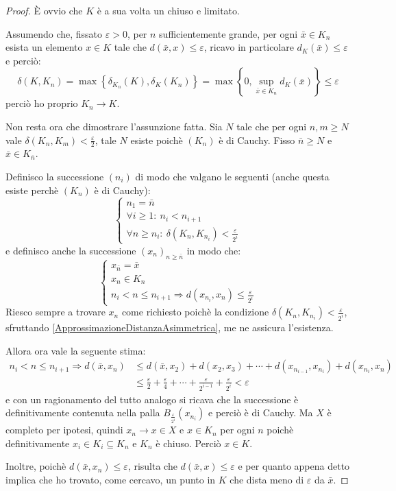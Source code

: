 \begin{proof}
	È ovvio che $K$ è a sua volta un chiuso e limitato.
	
	Assumendo che, fissato $\varepsilon>0$, per $n$ sufficientemente grande, per ogni $\bar{x}\in K_n$ esista un elemento $x\in K$ tale che $d(\bar{x},x)\le \varepsilon$, ricavo in particolare $d_K(\bar{x})\le \varepsilon$ e perciò: 
	\begin{equation*}
		\delta(K,K_n)=\max\left\{\delta_{K_n}(K),\delta_K(K_n)\right\}=\max\left\{0,{}\sup_{\bar{x}\in K_n} d_K(\bar x)\right\}\le \varepsilon
	\end{equation*}
	perciò ho proprio $K_n\to K$.
	
	Non resta ora che dimostrare l'assunzione fatta. Sia $N$ tale che per ogni $n,m\ge N$ vale $\delta(K_n,K_m) < \frac{\varepsilon}2$, tale $N$ esiste poichè $(K_n)$ è di Cauchy. Fisso $\bar{n}\ge N$ e $\bar x\in K_{\bar n}$.
	
	Definisco la successione $(n_i)$ di modo che valgano le seguenti (anche questa esiste perchè $(K_n)$ è di Cauchy):
	\begin{equation*}
	\begin{cases}
		n_1=\bar n\\
		\forall i\ge 1:\ n_i<n_{i+1} \\
		\forall n\ge n_i:\ \delta(K_n,K_{n_i}) < \frac{\varepsilon}{2^i}
	\end{cases}\end{equation*}
	e definisco anche la successione $(x_n)_{n\ge \bar n}$ in modo che:
	\begin{equation*}\begin{cases}
		x_{\bar n}=\bar x\\
		x_n\in K_n\\
		n_i<n\le n_{i+1}\Longrightarrow d(x_{n_i},x_n)\le \frac{\varepsilon}{2^i}
	\end{cases}\end{equation*}
	Riesco sempre a trovare $x_n$ come richiesto poichè la condizione $\delta(K_n,K_{n_i}) < \frac{\varepsilon}{2^i}$, sfruttando \cref{ApprossimazioneDistanzaAsimmetrica}, me ne assicura l'esistenza.
	
	Allora ora vale la seguente stima:
	\begin{align*}
		n_i<n\le n_{i+1}\Longrightarrow d(\bar x, x_n)&\le d(\bar x, x_2)+d(x_2,x_3)+\cdots+d(x_{n_{i-1}},x_{n_i})+
		d(x_{n_i},x_n)\\
		&\le\frac{\varepsilon}2+\frac{\varepsilon}4+\cdots+\frac{\varepsilon}{2^{i-1}}
		+\frac{\varepsilon}{2^i}<\varepsilon
	\end{align*}
	e con un ragionamento del tutto analogo si ricava che la successione è definitivamente contenuta nella palla $B_{\frac{\varepsilon}{2^i}}(x_{n_i})$ e perciò è di Cauchy. 
	Ma $X$ è completo per ipotesi, quindi $x_n\to x\in X$ e $x\in K_n$ per ogni $n$ poichè definitivamente $x_i\in K_i \subseteq K_n$ e $K_n$ è chiuso. Perciò $x\in K$.
	
	Inoltre, poichè $d(\bar x,x_n)\le \varepsilon$, risulta che $d(\bar x, x)\le \varepsilon$ e per quanto appena detto implica che ho trovato, come cercavo, un punto in $K$ che dista meno di $\varepsilon$ da $\bar x$.
	
\end{proof}

